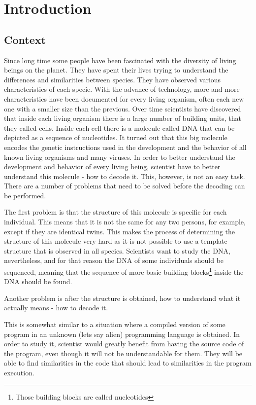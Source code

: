 \documentclass[11pt]{article}
\begin{document}
\section{Introduction}
\label{sec:Introduction}

\subsection{Context}
\label{sub:Contex}
Since long time some people have been fascinated with the diversity of
living beings on the planet. They have spent their lives trying to understand
the differences and similarities between species. They have observed various
characteristics of each specie. With the advance of technology, more and more
characteristics have been documented for every living organism, often each new
one with a smaller size than the previous. Over time scientists have discovered
that inside each living organism there is a large number of building units, that
they called cells. Inside each cell there is a molecule called DNA that can be
depicted as a sequence of nucleotides. It turned out that this big molecule
encodes the genetic instructions used in the development and the behavior of all
known living organisms and many viruses. In order to better understand the
development and behavior of every living being, scientist have to better
understand this molecule - how to decode it. This, however, is not an
easy task. There are a number of problems that need to be solved before the
decoding can be performed.

The first problem is that the structure of this molecule is specific for each
individual. This means that it is not the same for any
two persons, for example, except if they are identical twins. This makes the
process of determining the structure of this molecule very hard as it is not
possible to use a template structure that is observed in all species. Scientists want
to study the DNA, nevertheless, and for that reason the DNA of some individuals
should be sequenced, meaning that the sequence of more basic building
blocks\footnote{Those building blocks are called nucleotides} inside the DNA
should be found.

Another problem is after the structure is obtained, how to understand what it
actually means - how to decode it.

This is somewhat similar to a situation where a compiled version of some program
in an unknown (lets say alien) programming language is obtained. In order to
study it, scientist would greatly benefit from having the source code of the
program, even though it will not be understandable for them. They will be able
to find similarities in the code that should lead to similarities in the program
execution.
\end{document}
